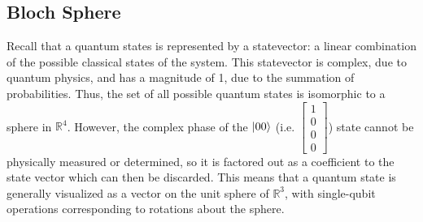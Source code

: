 \documentclass[12pt]{article}
\begin{document}
\subsection{Bloch Sphere}
Recall that a quantum states is represented by a statevector: a linear combination of the possible classical states of the system. This statevector is complex, due to quantum physics, and has a magnitude of 1, due to the summation of probabilities. Thus, the set of all possible quantum states is isomorphic to a sphere in $\mathbb{R}^4$. However, the complex phase of the $\ket{00}$ (i.e. $\left[\begin{smallmatrix} 1 \\ 0 \\ 0 \\ 0 \end{smallmatrix}\right]$) state cannot be physically measured or determined, so it is factored out as a coefficient to the state vector which can then be discarded. This means that a quantum state is generally visualized as a vector on the unit sphere of $\mathbb{R}^3$, with single-qubit operations corresponding to rotations about the sphere.
\end{document}
